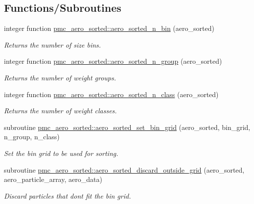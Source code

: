 \subsection*{Functions/\+Subroutines}
\begin{DoxyCompactItemize}
\item 
integer function \mbox{\hyperlink{namespacepmc__aero__sorted_ab9d526ab2c18f3b7ee01dd57cb87c733}{pmc\+\_\+aero\+\_\+sorted\+::aero\+\_\+sorted\+\_\+n\+\_\+bin}} (aero\+\_\+sorted)
\begin{DoxyCompactList}\small\item\em Returns the number of size bins. \end{DoxyCompactList}\item 
integer function \mbox{\hyperlink{namespacepmc__aero__sorted_ac4d78c0767389592acbc13d935d8561a}{pmc\+\_\+aero\+\_\+sorted\+::aero\+\_\+sorted\+\_\+n\+\_\+group}} (aero\+\_\+sorted)
\begin{DoxyCompactList}\small\item\em Returns the number of weight groups. \end{DoxyCompactList}\item 
integer function \mbox{\hyperlink{namespacepmc__aero__sorted_ae636353a0655df03ed70f4aa894cd11a}{pmc\+\_\+aero\+\_\+sorted\+::aero\+\_\+sorted\+\_\+n\+\_\+class}} (aero\+\_\+sorted)
\begin{DoxyCompactList}\small\item\em Returns the number of weight classes. \end{DoxyCompactList}\item 
subroutine \mbox{\hyperlink{namespacepmc__aero__sorted_a389f4693b9a0f1323857ddff666b05c5}{pmc\+\_\+aero\+\_\+sorted\+::aero\+\_\+sorted\+\_\+set\+\_\+bin\+\_\+grid}} (aero\+\_\+sorted, bin\+\_\+grid, n\+\_\+group, n\+\_\+class)
\begin{DoxyCompactList}\small\item\em Set the bin grid to be used for sorting. \end{DoxyCompactList}\item 
subroutine \mbox{\hyperlink{namespacepmc__aero__sorted_a86c04602bda530bf729e36acf607a0cf}{pmc\+\_\+aero\+\_\+sorted\+::aero\+\_\+sorted\+\_\+discard\+\_\+outside\+\_\+grid}} (aero\+\_\+sorted, aero\+\_\+particle\+\_\+array, aero\+\_\+data)
\begin{DoxyCompactList}\small\item\em Discard particles that don\textquotesingle{}t fit the bin grid. \end{DoxyCompactList}\item 

\end{DoxyCompactItemize}

